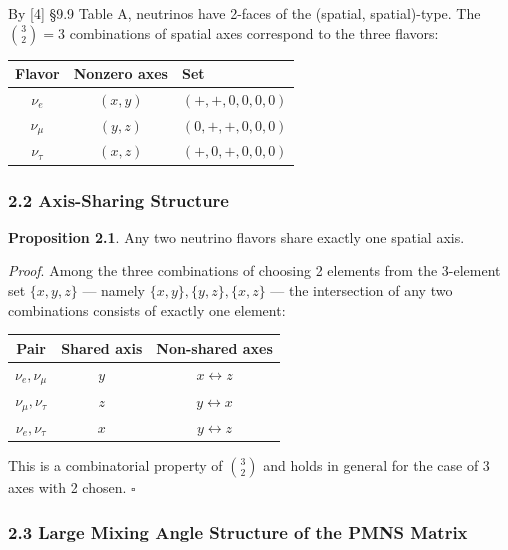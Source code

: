 \documentclass[
  a4paper,11pt]{article}
\newcounter{none} %
\begin{document}
By {[}4{]} §9.9 Table A, neutrinos have 2-faces of the (spatial,
spatial)-type. The \(\binom{3}{2} = 3\) combinations of spatial axes
correspond to the three flavors:

{\def\LTcaptype{none} %
\begin{longtable}[]{@{}ccl@{}}
\toprule\noalign{}
Flavor & Nonzero axes & Set \\
\midrule\noalign{}
\endhead
\bottomrule\noalign{}
\endlastfoot
\(\nu_e\) & \((x, y)\) & \((+, +, 0, 0, 0, 0)\) \\
\(\nu_\mu\) & \((y, z)\) & \((0, +, +, 0, 0, 0)\) \\
\(\nu_\tau\) & \((x, z)\) & \((+, 0, +, 0, 0, 0)\) \\
\end{longtable}
}

\subsubsection{2.2 Axis-Sharing Structure}\label{axis-sharing-structure}

\textbf{Proposition 2.1}. Any two neutrino flavors share exactly one
spatial axis.

\emph{Proof}. Among the three combinations of choosing 2 elements from
the 3-element set \(\{x, y, z\}\) --- namely
\(\{x,y\}, \{y,z\}, \{x,z\}\) --- the intersection of any two
combinations consists of exactly one element:

{\def\LTcaptype{none} %
\begin{longtable}[]{@{}ccc@{}}
\toprule\noalign{}
Pair & Shared axis & Non-shared axes \\
\midrule\noalign{}
\endhead
\bottomrule\noalign{}
\endlastfoot
\(\nu_e, \nu_\mu\) & \(y\) & \(x \leftrightarrow z\) \\
\(\nu_\mu, \nu_\tau\) & \(z\) & \(y \leftrightarrow x\) \\
\(\nu_e, \nu_\tau\) & \(x\) & \(y \leftrightarrow z\) \\
\end{longtable}
}

This is a combinatorial property of \(\binom{3}{2}\) and holds in
general for the case of 3 axes with 2 chosen. \(\square\)

\subsubsection{2.3 Large Mixing Angle Structure of the PMNS
Matrix}\label{large-mixing-angle-structure-of-the-pmns-matrix}
\end{document}
